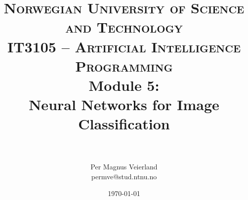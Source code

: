 

\usepackage{float}

\title{	
\normalfont \normalsize 
\textsc{Norwegian University of Science and Technology\\IT3105 -- Artificial Intelligence Programming}
\horrule{0.5pt} \\[0.4cm]
\huge Module 5:\\ Neural Networks for Image Classification\\
\horrule{2pt} \\[0.5cm]
}

\author{Per Magnus Veierland\\permve@stud.ntnu.no}

\date{\normalsize\today}




\fancyfoot[C]{}
\maketitle

\newpage


